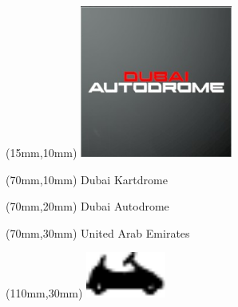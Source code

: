 \null\newpage
\begin{textblock*}{50mm}(15mm,10mm)%
\includegraphics[width=50mm]{LG/2015-05-20_00081.png}
\end{textblock*}
\begin{textblock*}{130mm}(70mm,10mm)%
{\fontsize{20}{20}\selectfont Dubai Kartdrome}\\
\end{textblock*}
\begin{textblock*}{120mm}(70mm,20mm)%
{\fontsize{16}{16}\selectfont Dubai Autodrome}\\
\end{textblock*}
\begin{textblock*}{120mm}(70mm,30mm)%
{\fontsize{12}{12}\selectfont United Arab Emirates}
\end{textblock*}
\begin{textblock*}{30mm}(110mm,30mm)%
\centering
\includegraphics[height=15mm]{icons/kart.pdf}
\end{textblock*}
